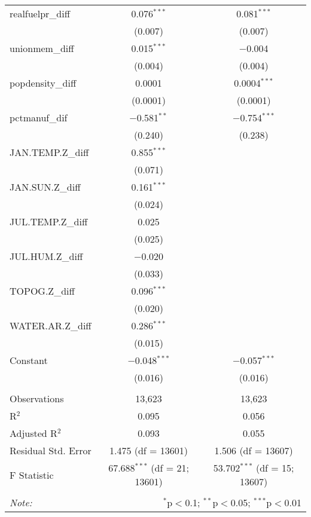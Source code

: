 \begin{table}[!htbp]
\begin{tabular}{@{\extracolsep{5pt}}lcc}
  realfuelpr\_diff & 0.076$^{***}$ & 0.081$^{***}$ \\ 
  & (0.007) & (0.007) \\ 
  unionmem\_diff & 0.015$^{***}$ & $-$0.004 \\ 
  & (0.004) & (0.004) \\ 
  popdensity\_diff & 0.0001 & 0.0004$^{***}$ \\ 
  & (0.0001) & (0.0001) \\ 
  pctmanuf\_dif & $-$0.581$^{**}$ & $-$0.754$^{***}$ \\ 
  & (0.240) & (0.238) \\ 
  JAN.TEMP.Z\_diff & 0.855$^{***}$ &  \\ 
  & (0.071) &  \\ 
  JAN.SUN.Z\_diff & 0.161$^{***}$ &  \\ 
  & (0.024) &  \\ 
  JUL.TEMP.Z\_diff & 0.025 &  \\ 
  & (0.025) &  \\ 
  JUL.HUM.Z\_diff & $-$0.020 &  \\ 
  & (0.033) &  \\ 
  TOPOG.Z\_diff & 0.096$^{***}$ &  \\ 
  & (0.020) &  \\ 
  WATER.AR.Z\_diff & 0.286$^{***}$ &  \\ 
  & (0.015) &  \\ 
  Constant & $-$0.048$^{***}$ & $-$0.057$^{***}$ \\ 
  & (0.016) & (0.016) \\ 
 \hline \\[-1.8ex] 
Observations & 13,623 & 13,623 \\ 
R$^{2}$ & 0.095 & 0.056 \\ 
Adjusted R$^{2}$ & 0.093 & 0.055 \\ 
Residual Std. Error & 1.475 (df = 13601) & 1.506 (df = 13607) \\ 
F Statistic & 67.688$^{***}$ (df = 21; 13601) & 53.702$^{***}$ (df = 15; 13607) \\ 
\hline 
\hline \\[-1.8ex] 
\textit{Note:}  & \multicolumn{2}{r}{$^{*}$p$<$0.1; $^{**}$p$<$0.05; $^{***}$p$<$0.01} \\ 
\end{tabular} 
\end{table} 
